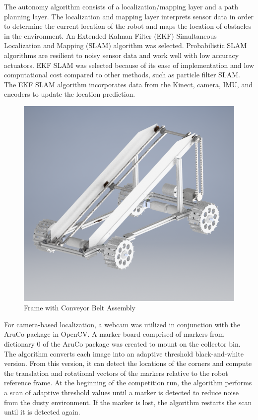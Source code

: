 \documentclass[class=article, crop=false]{standalone}
\begin{document}
	The autonomy algorithm consists of a localization/mapping layer and a path planning layer. The localization and mapping layer interprets sensor data in order to determine the current location of the robot and maps the location of obstacles in the environment. An Extended Kalman Filter (EKF) Simultaneous Localization and Mapping (SLAM) algorithm was selected. Probabilistic SLAM algorithms are resilient to noisy sensor data and work well with low accuracy actuators. EKF SLAM was selected because of its ease of implementation and low computational cost compared to other methods, such as particle filter SLAM. The EKF SLAM algorithm incorporates data from the Kinect, camera, IMU, and encoders to update the location prediction.
	
	\begin{figure}
	\centering
	 \includegraphics[width=0.9\linewidth]{09_Figures/conveyor-frame-cad.jpg}
	 \caption{Frame with Conveyor Belt Assembly}
	 \label{fig:con-cad}
	\end{figure}
	
	For camera-based localization, a webcam was utilized in conjunction with the AruCo package in OpenCV. A marker board comprised of markers from dictionary 0 of the AruCo package was created to mount on the collector bin. The algorithm converts each image into an adaptive threshold black-and-white version. From this version, it can detect the locations of the corners and compute the translation and rotational vectors of the markers relative to the robot reference frame. At the beginning of the competition run, the algorithm performs a scan of adaptive threshold values until a marker is detected to reduce noise from the dusty environment. If the marker is lost, the algorithm restarts the scan until it is detected again. 
\end{document}

